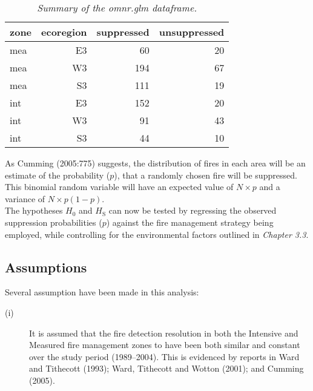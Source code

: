 \begin{spacing}{1.5}
\begin{center}
\begin{table}[ht]
\begin{center}
\begin{tabular}{|l|r|r|r|}
  \hline
zone & ecoregion & suppressed & unsuppressed \\ 
  \hline
mea & E3 & 60 & 20 \\ 
  mea & W3 & 194 & 67 \\ 
  mea & S3 & 111 & 19 \\ 
  int & E3 & 152 & 20 \\ 
  int & W3 & 91 & 43 \\ 
  int & S3 & 44 & 10 \\ 
   \hline
\end{tabular}
\caption[Summary of the omnr.glm dataframe.]{\emph{Summary of the omnr.glm dataframe.}}
\label{tab1}
\end{center}
\end{table}\end{center}
\noindent As Cumming (2005:775) suggests, the distribution of fires in each area will be an estimate of the probability ($p$), that a randomly chosen fire will be suppressed. This binomial random variable will have an expected value of $N\times p$ and a variance of $N\times p(1-p)$. \\

\noindent The hypotheses $H_{\mathrm{0}}$ and $H_{\mathrm{S}}$ can now be tested by regressing the observed  suppression probabilities ($p$) against the fire management strategy being employed, while controlling for the environmental factors outlined in \emph{Chapter 3.3}. \\

\clearpage
\subsection{Assumptions}

Several assumption have been made in this analysis: \\

\begin{description}
\item[(i)]
It is assumed that the fire detection resolution in both the Intensive and Measured fire management zones to have been both similar and constant over the study period (1989--2004). This is evidenced by reports in Ward and Tithecott (1993); Ward, Tithecott and Wotton (2001); and Cumming (2005).\\


\end{description}
\end{spacing}
